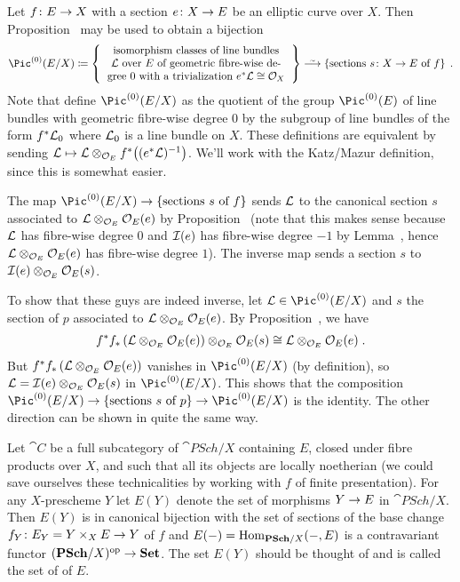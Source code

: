 \documentclass[a4paper,parskip=half,numbers=enddot, DIV=12]{scrreprt}
\begin{document}
\begin{rem}
	Let $f\colon E\morphism X$ with a section $e\colon X\morphism E$ be an elliptic curve over $X$. Then Proposition~ may be used to obtain a bijection
	\begin{align*}
		\Pic^{(0)}(E/X)\coloneqq\left\{\begin{tabular}{c}
			isomorphism classes of line bundles\\
			$\Ll$ over $E$ of geometric fibre-wise de-\\
			gree 0 with a trivialization $e^*\Ll\cong\Oo_X$
		\end{tabular}\right\}\isomorphism\left\{\text{sections }s\colon X\to E\text{ of }f\right\}\;.
	\end{align*}
	Note that \cite[pp.~63--67]{katzmazur} define $\Pic^{(0)}(E/X)$ as the quotient of the group $\Pic^{(0)}(E)$ of line bundles with geometric fibre-wise degree $0$ by the subgroup of line bundles of the form $f^*\mathcal{L}_0$ where $\mathcal{L}_0$ is a line bundle on $X$. These definitions are equivalent by sending $\mathcal{L}\mapsto \mathcal{L}\otimes_{\mathcal{O}_E}f^*\big((e^*\mathcal{L})^{-1}\big)$. We'll work with the Katz/Mazur definition, since this is somewhat easier.
	
	The map $\Pic^{(0)}(E/X)\morphism\{\text{sections }s\text{ of }f\}$ sends $\mathcal{L}$ to the canonical section $s$ associated to $\mathcal{L}\otimes_{\mathcal{O}_E}\mathcal{O}_E(e)$ by Proposition~ (note that this makes sense because $\mathcal{L}$ has fibre-wise degree $0$ and $\mathcal{I}(e)$ has fibre-wise degree $-1$ by Lemma~, hence $\mathcal{L}\otimes_{\mathcal{O}_E}\mathcal{O}_E(e)$ has fibre-wise degree $1$). The inverse map sends a section $s$ to $\mathcal{I}(e)\otimes_{\mathcal{O}_E}\mathcal{O}_E(s)$.
	
	To show that these guys are indeed inverse, let $\Ll\in\Pic^{(0)}(E/X)$ and $s$ the section of $p$ associated to $\mathcal{L}\otimes_{\mathcal{O}_E}\mathcal{O}_E(e)$. By Proposition~, we have
	\begin{align*}
		f^*f_*\left(\mathcal{L}\otimes_{\mathcal{O}_E}\mathcal{O}_E(e)\right)\otimes_{\mathcal{O}_E}\mathcal{O}_E(s)\cong\mathcal{L}\otimes_{\mathcal{O}_E}\mathcal{O}_E(e)\;.
	\end{align*}
	But $f^*f_*\left(\mathcal{L}\otimes_{\mathcal{O}_E}\mathcal{O}_E(e)\right)$ vanishes in $\Pic^{(0)}(E/X)$ (by definition), so $\mathcal{L}=\mathcal{I}(e)\otimes_{\mathcal{O}_E}\mathcal{O}_E(s)$ in $\Pic^{(0)}(E/X)$. This shows that the composition $\Pic^{(0)}(E/X)\morphism\{\text{sections }s\text{ of }p\}\morphism\Pic^{(0)}(E/X)$ is the identity. The other direction can be shown in quite the same way.
	
	Let $\cat C$ be a full subcategory of $\cat{PSch}/X$ containing $E$, closed under fibre products over $X$, and such that all its objects are locally noetherian (we could save ourselves these technicalities by working with $f$ of finite presentation). For any $X$-prescheme $Y$ let $E(Y)$ denote the set of morphisms $Y\morphism E$ in $\cat{PSch}/X$. Then $E(Y)$ is in canonical bijection with the set of sections of the base change $f_Y\colon E_Y=Y\times_XE\morphism Y$ of $f$ and $E(-)=\Hom_{\cat{PSch}/X}(-,E)$ is a contravariant functor $(\cat{PSch}/X)^\op\morphism\cat{Set}$. The set $E(Y)$ should be thought of and is called the set of  of $E$.
	

\end{rem}
\end{document}

